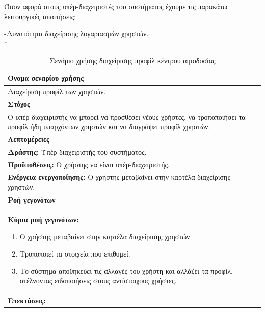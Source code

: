 \newpage			
Όσον αφορά στους υπέρ-διαχειριστές του συστήματος έχουμε τις παρακάτω λειτουργικές απαιτήσεις:

-Δυνατότητα διαχείρισης λογαριασμών χρηστών.
\\*
\begin{table}[H]
	\begin{center}
	    \begin{tabular}{|p{\dimexpr \linewidth-2\tabcolsep}|}
	    \hline
	    \rowcolor{grayy}
	    \textbf{Όνομα σεναρίου χρήσης}
	    \\ \hline    
	    Διαχείριση προφίλ των χρηστών.
	     \\ \hline
	    \rowcolor{grayy}
	    \textbf{\textbf{Στόχος}}
	    \\ \hline
	 	 Ο υπέρ-διαχειριστής να μπορεί να προσθέσει νέους χρήστες, να τροποποιήσει τα προφίλ ήδη υπαρχόντων χρηστών και να διαγράψει προφίλ χρηστών.
	     \\ \hline	    
	     \rowcolor{grayy}
	    \textbf{Λεπτομέρειες}
	    \\ \hline
		\textbf{Δράστης:} Υπέρ-διαχειριστής του συστήματος. 
		\\*
		\textbf{Προϋποθέσεις:} Ο χρήστης να είναι υπέρ-διαχειριστής.
		\\*
		\textbf{Ενέργεια ενεργοποίησης:} Ο χρήστης μεταβαίνει στην καρτέλα διαχείρισης χρηστών.
	    \\ \hline
		\rowcolor{grayy}    
	    \textbf{Ροή γεγονότων}
	    \\ \hline
		\textbf{Κύρια ροή γεγονότων:}
		\begin{enumerate}
			\item	 Ο χρήστης μεταβαίνει στην καρτέλα διαχείρισης χρηστών.
			\item Τροποποιεί τα στοιχεία που επιθυμεί.
			\item Το σύστημα αποθηκεύει τις αλλαγές του χρήστη και αλλάζει τα προφίλ, στέλνοντας ειδοποιήσεις στους αντίστοιχους χρήστες.
		\end{enumerate}
		\\ \hline
		\rowcolor{grayy}
		\textbf{Επεκτάσεις:}
		   \\ \hline
	    \end{tabular}
	    \caption{Σενάριο χρήσης διαχείρισης προφίλ κέντρου αιμοδοσίας}
	    \label{tab:profile_management_superadmin}
	\end{center}
\end{table}	


